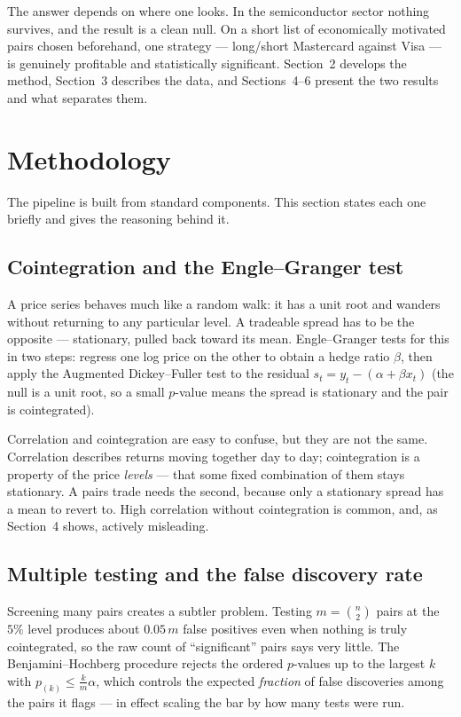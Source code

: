 \documentclass[11pt]{article}
\begin{document}
The answer depends on where one looks. In the semiconductor sector nothing survives, and the result is a
clean null. On a short list of economically motivated pairs chosen beforehand, one strategy --- long/short
Mastercard against Visa --- is genuinely profitable and statistically significant. Section~2 develops the
method, Section~3 describes the data, and Sections~4--6 present the two results and what separates them.

\section{Methodology}
The pipeline is built from standard components. This section states each one briefly and gives the
reasoning behind it.

\subsection{Cointegration and the Engle--Granger test}
A price series behaves much like a random walk: it has a unit root and wanders without returning to any
particular level. A tradeable spread has to be the opposite --- stationary, pulled back toward its mean.
Engle--Granger tests for this in two steps: regress one log price on the other to obtain a hedge ratio
$\beta$, then apply the Augmented Dickey--Fuller test to the residual $s_t = y_t - (\alpha + \beta x_t)$
(the null is a unit root, so a small $p$-value means the spread is stationary and the pair is
cointegrated).

Correlation and cointegration are easy to confuse, but they are not the same. Correlation describes
returns moving together day to day; cointegration is a property of the price \emph{levels} --- that some
fixed combination of them stays stationary. A pairs trade needs the second, because only a stationary
spread has a mean to revert to. High correlation without cointegration is common, and, as Section~4 shows,
actively misleading.

\subsection{Multiple testing and the false discovery rate}
Screening many pairs creates a subtler problem. Testing $m=\binom{n}{2}$ pairs at the $5\%$ level produces
about $0.05\,m$ false positives even when nothing is truly cointegrated, so the raw count of ``significant''
pairs says very little. The Benjamini--Hochberg procedure rejects the ordered $p$-values up to the largest
$k$ with $p_{(k)} \le \tfrac{k}{m}\alpha$, which controls the expected \emph{fraction} of false discoveries
among the pairs it flags --- in effect scaling the bar by how many tests were run.
\end{document}

